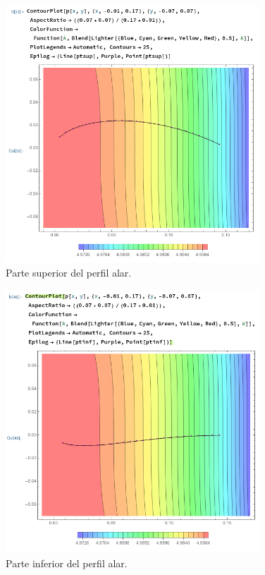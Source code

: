 \documentclass[12pt, letterpaper]{article}
\begin{document}
\begin{figure}[H]
	\centering
	\includegraphics[width=0.85\textwidth]{11.png}
	\caption{Parte superior del perfil alar.}
\end{figure}

\begin{figure}[H]
	\centering
	\includegraphics[width=0.85\textwidth]{12.png}
	\caption{Parte inferior del perfil alar.}
\end{figure}
\end{document}

